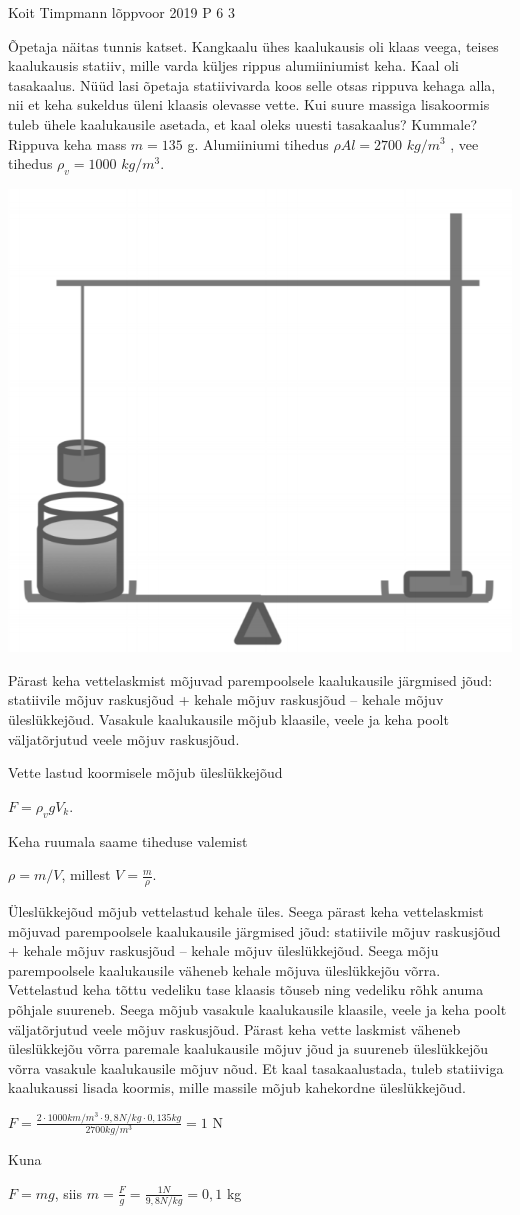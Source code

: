 {Koit Timpmann} %
{lõppvoor} %
{2019} %
{P 6} %
{3} %
{
\ifStatement
Õpetaja näitas tunnis katset. Kangkaalu ühes kaalukausis oli klaas veega, teises kaalukausis statiiv, mille varda küljes rippus alumiiniumist keha. Kaal oli tasakaalus. Nüüd lasi õpetaja statiivivarda koos selle otsas rippuva kehaga alla, nii et keha sukeldus üleni klaasis olevasse vette. Kui suure massiga lisakoormis tuleb ühele kaalukausile asetada, et kaal oleks uuesti tasakaalus? Kummale? Rippuva keha mass $m = 135$ g. Alumiiniumi tihedus $\rho Al = 2700$ $kg/m^3$ , vee tihedus $\rho_v = 1000$ $kg/m^3$.
\begin{center}
	\includegraphics[width=0.5\linewidth]{2019-v3p-06-yl.PNG}
\end{center}
\fi

\ifHint
Pärast keha vettelaskmist mõjuvad parempoolsele kaalukausile järgmised jõud: statiivile mõjuv raskusjõud + kehale mõjuv raskusjõud – kehale mõjuv üleslükkejõud. Vasakule kaalukausile mõjub klaasile, veele ja keha poolt väljatõrjutud veele mõjuv raskusjõud.
\fi

\ifSolution
Vette lastud koormisele mõjub üleslükkejõud
\begin{center}
$F = \rho_v gV_k$.
\end{center}
Keha ruumala saame tiheduse valemist
\begin{center}
$\rho = m/V$, millest $V = \frac{m}{\rho}$.
\end{center}
Üleslükkejõud mõjub vettelastud kehale üles. Seega pärast keha vettelaskmist mõjuvad parempoolsele kaalukausile järgmised jõud: statiivile mõjuv raskusjõud + kehale mõjuv raskusjõud – kehale mõjuv üleslükkejõud. Seega mõju parempoolsele kaalukausile väheneb kehale mõjuva üleslükkejõu võrra. Vettelastud keha tõttu vedeliku tase klaasis tõuseb ning vedeliku rõhk anuma põhjale suureneb. Seega mõjub vasakule kaalukausile klaasile, veele ja keha poolt väljatõrjutud veele mõjuv raskusjõud. Pärast keha vette laskmist väheneb üleslükkejõu võrra paremale kaalukausile mõjuv jõud ja suureneb üleslükkejõu võrra vasakule kaalukausile mõjuv nõud. Et kaal tasakaalustada, tuleb statiiviga kaalukaussi lisada koormis, mille massile mõjub kahekordne üleslükkejõud.
\begin{center}
$F = \frac{2 \cdot 1000 km/m^3 \cdot 9,8 N/kg \cdot 0,135kg}{2700 kg/m^3} = 1$ N
\end{center}
Kuna
\begin{center}
$F = mg$, siis $m = \frac{F}{g} = \frac{1 N}{9,8 N/kg} = 0,1$ kg
\end{center}
\fi
}